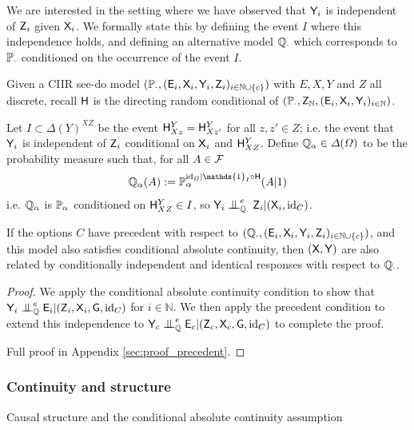We are interested in the setting where we have observed that $\mathsf{Y}_i$ is independent of $\mathsf{Z}_i$ given $\mathsf{X}_i$. We formally state this by defining the event $I$ where this independence holds, and defining an alternative model $\mathbb{Q}_{\cdot}$ which corresponds to $\mathbb{P}_\cdot$ conditioned on the occurrence of the event $I$.

\begin{theorem}\label{th:latent_to_observable}
Given a CIIR see-do model $(\mathbb{P}_\cdot,(\mathsf{E}_i,\mathsf{X}_i,\mathsf{Y}_i,\mathsf{Z}_i)_{i\in\mathbb{N}\cup\{c\}})$ with $E,X,Y$ and $Z$ all discrete, recall $\mathsf{H}$ is the directing random conditional of $(\mathbb{P}_\cdot,\mathsf{Z}_{\mathbb{N}},(\mathsf{E}_i,\mathsf{X}_i,\mathsf{Y}_i)_{i\in \mathbb{N}})$.

Let $I\subset \Delta(Y)^{XZ}$ be the event $\mathsf{H}^Y_{Xz}=\mathsf{H}^Y_{Xz'}$ for all $z,z'\in Z$; i.e. the event that $\mathsf{Y}_i$ is independent of $\mathsf{Z}_i$ conditional on $\mathsf{X}_i$ and $\mathsf{H}^Y_{XZ}$. Define $\mathbb{Q}_\alpha\in \Delta(\Omega)$ to be the probability measure such that, for all $A\in \mathcal{F}$
\begin{align}
\prob{Q}_\alpha(A) := \prob{P}_\alpha^{\mathrm{id}_\Omega|\mathds{1}_I\circ \RV{H}}(A|1)
\end{align}
i.e. $\mathbb{Q}_\alpha$ is $\mathbb{P}_\alpha$ conditioned on $\mathsf{H}^Y_{XZ}\in I$, so $\RV{Y}_i\CI^e_{\prob{Q}_\cdot} \RV{Z}_i|(\RV{X}_i,\mathrm{id}_C)$.

If the options $C$ have precedent with respect to $(\mathbb{Q}_\cdot,(\mathsf{E}_i,\mathsf{X}_i,\mathsf{Y}_i,\mathsf{Z}_i)_{i\in\mathbb{N}\cup\{c\}})$, and this model also satisfies conditional absolute continuity, then $(\mathsf{X},\mathsf{Y})$ are also related by conditionally independent and identical responses with respect to $\mathbb{Q}_\cdot$.
\end{theorem}

\begin{proof}
We apply the conditional absolute continuity condition to show that $\RV{Y}_i\CI^e_{\prob{Q}} \RV{E}_i|(\RV{Z}_i,\RV{X}_i,\RV{G},\text{id}_C)$ for $i\in \mathbb{N}$. We then apply the precedent condition to extend this independence to $\RV{Y}_c\CI^e_{\prob{Q}} \RV{E}_c|(\RV{Z}_c,\RV{X}_c,\RV{G},\text{id}_C)$ to complete the proof.

Full proof in Appendix \ref{sec:proof_precedent}.
\end{proof}

\subsubsection{Continuity and structure}{Causal structure and the conditional absolute continuity assumption}

